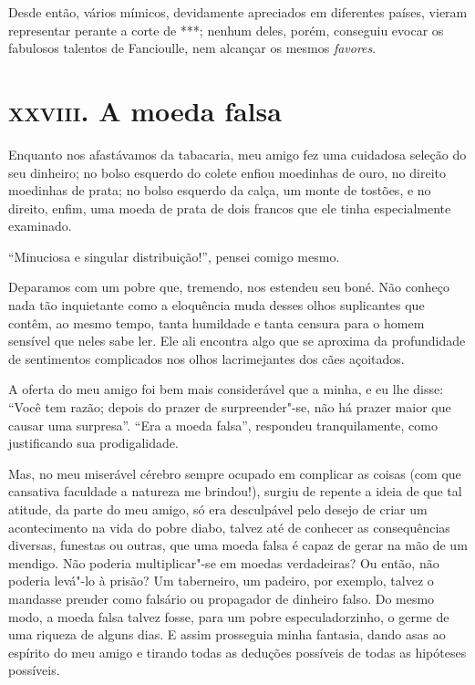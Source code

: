 Desde então, vários mímicos, devidamente apreciados em diferentes
países, vieram representar perante a corte de ***; nenhum deles, porém,
conseguiu evocar os fabulosos talentos de Fancioulle, nem alcançar
os mesmos \textit{favores}. 

\chapter{\textsc{xxviii.} A moeda falsa}

Enquanto nos afastávamos da tabacaria, meu amigo fez uma cuidadosa
seleção do seu dinheiro; no bolso esquerdo do colete enfiou
moedinhas de ouro, no direito moedinhas de prata; no bolso esquerdo da calça, um monte de tostões, e no direito, enfim, uma moeda de prata
de dois francos que ele tinha especialmente examinado.

``Minuciosa e singular distribuição!'', pensei
comigo mesmo.

Deparamos com um pobre que, tremendo, nos estendeu seu boné. Não
conheço nada tão inquietante como a eloquência muda desses olhos
suplicantes que contêm, ao mesmo tempo, tanta humildade e tanta censura para o homem sensível que neles
sabe ler. Ele ali encontra algo que se
aproxima da profundidade de sentimentos complicados nos olhos
lacrimejantes dos cães açoitados.

A oferta do meu amigo foi bem mais considerável que a minha, e eu lhe
disse: ``Você tem razão; depois do prazer de
surpreender"-se, não há prazer maior que causar uma surpresa''. 
``Era a moeda falsa'', respondeu tranquilamente, como justificando sua prodigalidade.

Mas, no meu miserável cérebro sempre ocupado em complicar as coisas (com
que cansativa faculdade a natureza me brindou!),
surgiu de repente a ideia de que tal atitude, da parte do meu amigo, só
era desculpável pelo desejo de criar um acontecimento na vida do
pobre diabo, talvez até de  conhecer as consequências diversas, funestas
ou outras, que uma moeda falsa é capaz de gerar na mão de um mendigo. Não
poderia multiplicar"-se em moedas verdadeiras? Ou então, não poderia
levá"-lo à prisão? Um taberneiro, um padeiro, por exemplo, talvez o
mandasse prender como falsário ou propagador de dinheiro falso. Do
mesmo modo, a moeda falsa talvez fosse, para um pobre especuladorzinho,
o germe de uma riqueza de alguns dias. E assim prosseguia minha
fantasia, dando asas ao espírito do meu amigo e tirando todas as
deduções possíveis de todas as hipóteses possíveis.

